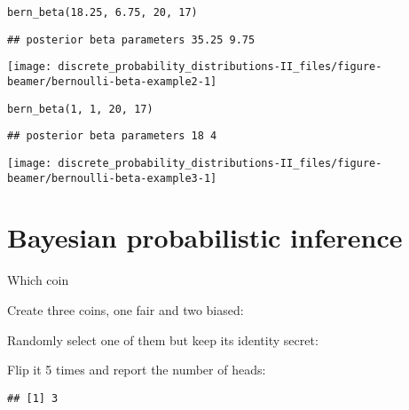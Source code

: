 \documentclass[ignorenonframetext,aspectratio=169]{beamer}
\begin{document}
\begin{frame}[fragile]{}
\protect\hypertarget{section-4}{}

\texttt{bern\_beta(18.25,\ 6.75,\ 20,\ 17)}

\begin{verbatim}
## posterior beta parameters 35.25 9.75
\end{verbatim}

\begin{center}\texttt{[image: discrete\_probability\_distributions-II\_files/figure-beamer/bernoulli-beta-example2-1]} \end{center}

\end{frame}

\begin{frame}[fragile]{}
\protect\hypertarget{section-5}{}

\texttt{bern\_beta(1,\ 1,\ 20,\ 17)}

\begin{verbatim}
## posterior beta parameters 18 4
\end{verbatim}

\begin{center}\texttt{[image: discrete\_probability\_distributions-II\_files/figure-beamer/bernoulli-beta-example3-1]} \end{center}

\end{frame}

\hypertarget{bayesian-probabilistic-inference}{%
\section{Bayesian probabilistic
inference}\label{bayesian-probabilistic-inference}}

\begin{frame}[fragile]{Which coin}
\protect\hypertarget{which-coin}{}

Create three coins, one fair and two biased:

Randomly select one of them but keep its identity secret:

Flip it 5 times and report the number of heads:

\begin{verbatim}
## [1] 3
\end{verbatim}

\end{frame}
\end{document}

